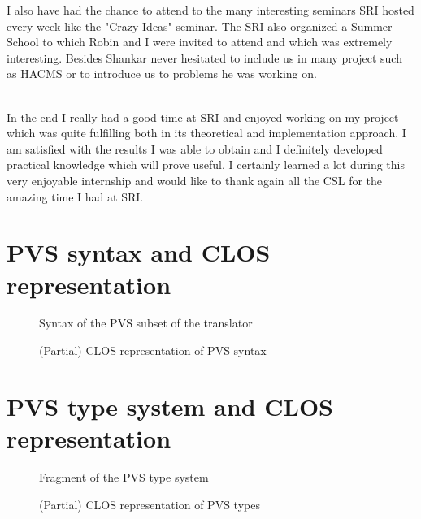 \documentclass[12pt,a4paper]{article}
\begin{document}
I also have had the chance to attend to the many interesting seminars SRI hosted every week like the "Crazy Ideas" seminar. The SRI also organized a Summer School to which Robin and I were invited to attend and which was extremely interesting. Besides Shankar never hesitated to include us in many project such as HACMS or to introduce us to problems he was working on. \\
\ \newline

In the end I really had a good time at SRI and enjoyed working on my project which was quite fulfilling both in its theoretical and implementation approach. I am satisfied with the results I was able to obtain and I definitely developed practical knowledge which will prove useful. I certainly learned a lot during this very enjoyable internship and would like to thank again all the CSL for the amazing time I had at SRI.


\printbibliography

\appendix

\newpage
\section{PVS syntax and CLOS representation}

\begin{figure}[h]

\caption{Syntax of the PVS subset of the translator}
\label{fig:PVSsyntax}
\end{figure}

\begin{figure}[!ht]

\caption{(Partial) CLOS representation of PVS syntax}
\label{fig:PVS-CLOS}
\end{figure}

\newpage
\section{PVS type system and CLOS representation}

\begin{figure}[!ht]

\caption{Fragment of the PVS type system}
\label{fig:PVS-types}
\end{figure}


\begin{figure}[!ht]

\caption{(Partial) CLOS representation of PVS types}
\label{fig:PVS-CLOS-types}
\end{figure}
\end{document}
